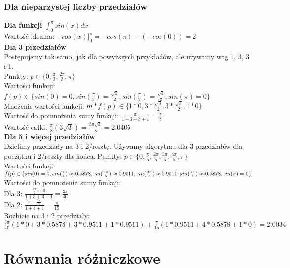 \documentclass{article}
\begin{document}
\subsubsection{Dla nieparzystej liczby przedziałów}
\textbf{Dla funkcji $\int_{0}^{\pi}sin(x)dx$}\\
Wartość idealna: $-cos(x)|^\pi_0=-cos(\pi)-(-cos(0))=2$\\
\textbf{Dla 3 przedziałów}\\
Postępujemy tak samo, jak dla powyższych przykładów, ale używamy wag 1, 3, 3 i 1.\\
Punkty: $p \in \{0, \frac{\pi}{3}, \frac{2\pi}{3}, \pi\}$\\
Wartości funkcji: $f(p) \in \{sin(0)=0, sin(\frac{\pi}{3})=\frac{\sqrt{3}}{2}, sin(\frac{\pi}{3})=\frac{\sqrt{3}}{2}, sin(\pi)=0\}$\\
Mnożenie wartości funkcji: $m*f(p) \in \{1*0, 3*\frac{\sqrt{3}}{2}, 3*\frac{\sqrt{3}}{2}, 1*0\}$\\
Wartość do pomnożenia sumy funkcji: $\frac{\pi}{1+3+3+1}=\frac{\pi}{8}$\\
Wartość całki: $\frac{\pi}{8}(3\sqrt{3})=\frac{3\pi \sqrt{3}}{8}=2.0405$\\
\textbf{Dla 5 i więcej przedziałów}\\
Dzielimy przedziały na 3 i 2/resztę. Używamy algorytmu dla 3 przedziałów dla początku i 2/reszty dla końca.
Punkty: $p \in \{0, \frac{\pi}{5}, \frac{2\pi}{5}, \frac{3\pi}{5}, \frac{4\pi}{5}, \pi\}$\\
Wartości funkcji: $f(p) \in \{sin(0)=0, sin(\frac{\pi}{5})\approx 0.5878, sin(\frac{2\pi}{5})\approx 0.9511, sin(\frac{3\pi}{5})\approx 0.9511,\\ sin(\frac{4\pi}{5})\approx 0.5878, sin(\pi)=0\}$\\
Wartości do pomnożenia sumy funkcji:\\
Dla 3: $\frac{\frac{3\pi}{5}-0}{1+3+3+1}=\frac{3\pi}{40}$\\
Dla 2: $\frac{\pi-\frac{3\pi}{5}}{1+4+1}=\frac{\pi}{15}$\\
Rozbicie na 3 i 2 przedziały: $\frac{3\pi}{40}(1*0+3*0.5878+3*0.9511+1*0.9511) + \frac{\pi}{15}(1*0.9511+4*0.5878+1*0)=2.0034$

\section{Równania różniczkowe}
\end{document}
